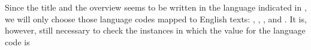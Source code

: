 \documentclass[letterpaper,10pt,english]{sphinxmanual}
\begin{document}
Since the title and the overview seems to be written in the language indicated in , we will only choose those language codes mapped to English texts: , , ,  and . It is, however, still necessary to check the instances in which the value for the language code is 

{
\begin{sphinxVerbatim}[commandchars=\\\{\}]
\llap{\color{nbsphinxin}[19]:\,\hspace{\fboxrule}\hspace{\fboxsep}}\PYG{p}{[}\PYG{p}{[} \PYG{p}{]}\PYG{p}{]}\PYG{p}{[}\PYG{p}{[}\PYG{p}{]}\PYG{p}{]} 
\end{sphinxVerbatim}
}
\end{document}
